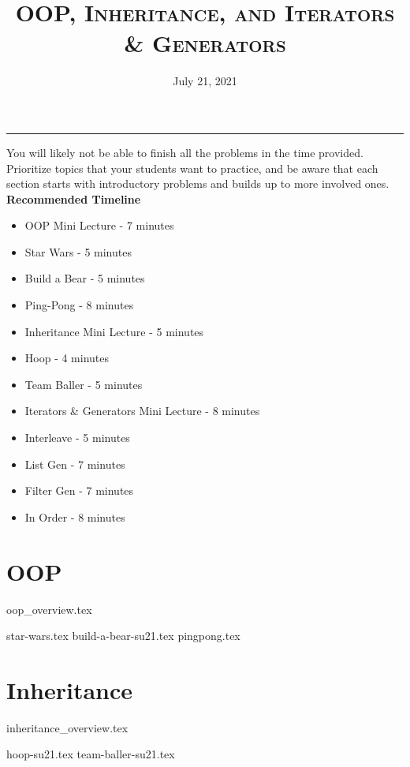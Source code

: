 \documentclass{exam}
\title{\textsc{OOP, Inheritance, and Iterators \& Generators}}
\date{July 21, 2021}
\begin{document}
\maketitle
\rule{\textwidth}{0.15em}
\fontsize{12}{15}\selectfont


\begin{guide}
    You will likely not be able to finish all the problems in the time provided. Prioritize topics that your students want to practice, 
    and be aware that each section starts with introductory problems and builds up to more involved ones.
    \newline
    \textbf{Recommended Timeline}
    \begin{itemize}
        \item OOP Mini Lecture - 7 minutes
        \item Star Wars - 5 minutes
        \item Build a Bear - 5 minutes
        \item Ping-Pong - 8 minutes
        \item Inheritance Mini Lecture - 5 minutes
        \item Hoop - 4 minutes
        \item Team Baller - 5 minutes
        \item Iterators \& Generators Mini Lecture - 8 minutes
        \item Interleave - 5 minutes
        \item List Gen - 7 minutes
        \item Filter Gen - 7 minutes
        \item In Order - 8 minutes
    \end{itemize}
\end{guide}

\section{OOP}
{oop_overview.tex}
\newpage
\begin{questions}
{star-wars.tex}
{build-a-bear-su21.tex}
{pingpong.tex}
\end{questions}

\newpage
\section{Inheritance}
{inheritance_overview.tex}
\begin{questions}
{hoop-su21.tex}
{team-baller-su21.tex}
\end{questions}
\end{document}
